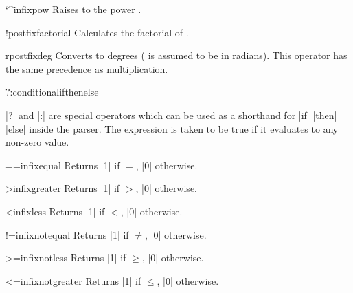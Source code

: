 \begin{math-operator}{\char`\^}{infix}{pow}
  Raises  to the power .
\end{math-operator}

\begin{math-operator}{!}{postfix}{factorial}
  Calculates the factorial of .
\end{math-operator}

\begin{math-operator}{r}{postfix}{deg}
  Converts  to degrees ( is assumed to be in radians).
  This operator has the same precedence as multiplication.
\end{math-operator}

\begin{math-operators}{?}{:}{conditional}{ifthenelse}

  |?| and |:| are special operators which can be used as a shorthand
  for |if|  |then|  |else|  inside the parser.
  The expression  is taken to be true if it evaluates to any
  non-zero value. 
  
\end{math-operators}

\begin{math-operator}{==}{infix}{equal}
  Returns |1| if $=$, |0| otherwise.
\end{math-operator}

\begin{math-operator}{>}{infix}{greater}
  Returns |1| if $>$, |0| otherwise.
\end{math-operator}

\begin{math-operator}{<}{infix}{less}
  Returns |1| if $<$, |0| otherwise.
\end{math-operator}

\begin{math-operator}{!=}{infix}{notequal}
  Returns |1| if $\neq$, |0| otherwise.
\end{math-operator}

\begin{math-operator}{>=}{infix}{notless}
  Returns |1| if $\geq$, |0| otherwise.
\end{math-operator}

\begin{math-operator}{<=}{infix}{notgreater}
  Returns |1| if $\leq$, |0| otherwise.
\end{math-operator}

